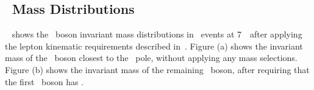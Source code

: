 
\subsection{\Z\ Mass Distributions}

~ shows the \Z\ boson invariant mass distributions in \ZZllll\ events at
7~\tev\ after applying the lepton kinematic requirements described
in~. Figure (a) shows the invariant
mass of the \Z\ boson closest to the \Z\ pole, without applying any mass
selections. Figure (b) shows the invariant
mass of the remaining \Z\ boson, after requiring that the first \Z\ boson
has \sstooos.

